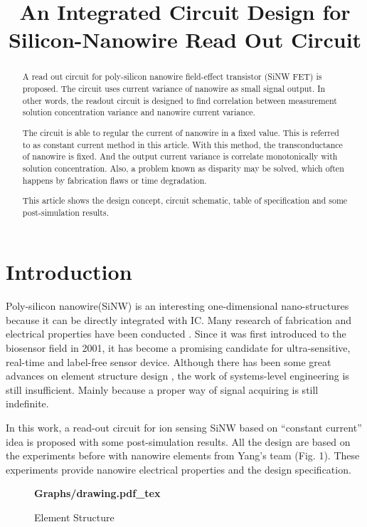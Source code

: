 \documentclass{article}
\title{An Integrated Circuit Design for Silicon-Nanowire Read Out Circuit}
\begin{document}
%
\maketitle
%
\begin{abstract}
A read out circuit for poly-silicon nanowire field-effect transistor (SiNW FET) is proposed.
The circuit uses current variance of nanowire as small signal output.
In other words, the readout circuit is designed to find correlation between measurement solution concentration variance and nanowire current variance.

The circuit is able to regular the current of nanowire in a fixed value.
This is referred to as constant current method in this article.
With this method, the transconductance of nanowire is fixed. And the output current variance is correlate monotonically with solution concentration.
Also, a problem known as disparity may be solved, which often happens by fabrication flaws or time degradation.

This article shows the design concept, circuit schematic, table of specification and some post-simulation results.
\end{abstract}
%
\section{Introduction}
\label{sec:intro}

Poly-silicon nanowire(SiNW) is an interesting one-dimensional nano-structures because it can be directly integrated with IC.
Many research of fabrication and electrical properties have been conducted \cite{J1}.
Since it was first introduced to the biosensor field in 2001\cite{J2}, it has become a promising candidate for ultra-sensitive, real-time and label-free  sensor device.
Although there has been some great advances on element structure design \cite{J3}, the work of systems-level engineering is still insufficient.
Mainly because a proper way of signal acquiring is still indefinite.

In this work, a read-out circuit for ion sensing SiNW based on “constant current” idea is proposed with some post-simulation results.
All the design are based on the experiments before with nanowire elements from Yang's team (Fig. 1\cite{J7}).
These experiments provide nanowire electrical properties and the design specification.



\begin{figure}[b]
    \centering
    {\selectfont\textbf{
        \def\svgwidth{5.0cm}
        \fontsize{6}{7}\selectfont
         {Graphs/drawing.pdf_tex}
    }}
    \fontsize{6}{7}\selectfont
    \caption{Element Structure}
    \label{fig:res}
\end{figure}
\end{document}
